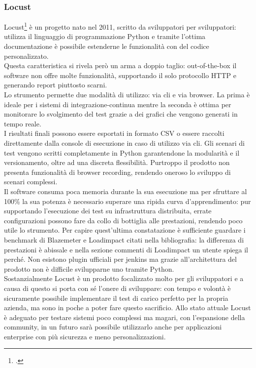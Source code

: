 \subsubsection{Locust}
Locust\footcite{site:locust} è un progetto nato nel 2011, scritto da sviluppatori per sviluppatori: utilizza il linguaggio di programmazione Python e tramite l'ottima documentazione è possibile estenderne le funzionalità con del codice personalizzato. \\
Questa caratteristica si rivela però un arma a doppio taglio: \gls{out-of-the-box} il software non offre molte funzionalità, supportando il solo protocollo HTTP e generando report piuttosto scarni.\\
Lo strumento permette due modalità di utilizzo: via \gls{cli} e via browser. La prima è ideale per i sistemi di \gls{integrazione-continua} mentre la seconda è ottima per monitorare lo svolgimento del test grazie a dei grafici che vengono generati in tempo reale. \\
I risultati finali possono essere esportati in formato CSV o essere raccolti direttamente dalla console di esecuzione in caso di utilizzo via \gls{cli}.
Gli scenari di test vengono scritti completamente in Python garantendone la modularità e il versionamento, oltre ad una discreta flessibilità. Purtroppo il prodotto non presenta funzionalità di browser recording, rendendo oneroso lo sviluppo di scenari complessi.\\
Il software consuma poca memoria durante la sua esecuzione ma per sfruttare al 100\% la sua potenza è necessario superare una ripida curva d'apprendimento: pur supportando l'esecuzione dei test su infrastruttura distribuita, errate configurazioni possono fare da collo di bottiglia alle prestazioni, rendendo poco utile lo strumento. Per capire quest'ultima constatazione è sufficiente guardare i benchmark di Blazemeter e Loadimpact citati nella bibliografia: la differenza di prestazioni è abissale e nella sezione commenti di Loadimpact un utente spiega il perché. 
Non esistono plugin ufficiali per jenkins ma grazie all'architettura del prodotto non è difficile svilupparne uno tramite Python. \\
Sostanzialmente Locust è un prodotto focalizzato molto per gli sviluppatori e a causa di questo si porta con sé l’onere di sviluppare: con tempo e volontà è sicuramente possibile implementare il test di carico perfetto per la propria azienda, ma sono in poche a poter fare questo sacrificio.
Allo stato attuale Locust è adeguato per testare sistemi poco complessi ma magari, con l’espansione della community, in un futuro sarà possibile utilizzarlo anche per applicazioni enterprise con più sicurezza e meno personalizzazioni.
